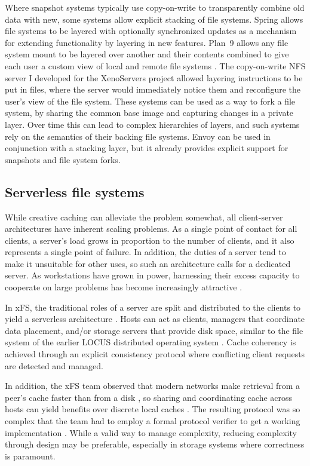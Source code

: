 Where snapshot systems typically use copy-on-write to transparently combine old data with new, some systems allow explicit stacking of file systems. Spring \cite{khalidi} allows file systems to be layered with optionally synchronized updates as a mechanism for extending functionality by layering in new features. Plan~9 \cite{pike90} allows any file system mount to be layered over another and their contents combined to give each user a custom view of local and remote file systems \cite{pike92}. The copy-on-write NFS server I developed for the XenoServers project \cite{kotsovinos} allowed layering instructions to be put in files, where the server would immediately notice them and reconfigure the user's view of the file system. These systems can be used as a way to fork a file system, by sharing the common base image and capturing changes in a private layer. Over time this can lead to complex hierarchies of layers, and such systems rely on the semantics of their backing file systems. Envoy can be used in conjunction with a stacking layer, but it already provides explicit support for snapshots and file system forks.

\subsection{Serverless file systems}

While creative caching can alleviate the problem somewhat, all client-server architectures have inherent scaling problems. As a single point of contact for all clients, a server's load grows in proportion to the number of clients, and it also represents a single point of failure. In addition, the duties of a server tend to make it unsuitable for other uses, so such an architecture calls for a dedicated server. As workstations have grown in power, harnessing their excess capacity to cooperate on large problems has become increasingly attractive \cite{anderson95a}.

In xFS, the traditional roles of a server are split and distributed to the clients to yield a serverless architecture \cite{wang93,anderson95b}. Hosts can act as clients, managers that coordinate data placement, and/or storage servers that provide disk space, similar to the file system of the earlier LOCUS distributed operating system \cite{walker}. Cache coherency is achieved through an explicit consistency protocol where conflicting client requests are detected and managed.

In addition, the xFS team observed that modern networks make retrieval from a peer's cache faster than from a disk \cite{dahlin94b}, so sharing and coordinating cache across hosts can yield benefits over discrete local caches \cite{dahlin94a}. The resulting protocol was so complex that the team had to employ a formal protocol verifier to get a working implementation \cite{wang98}. While a valid way to manage complexity, reducing complexity through design may be preferable, especially in storage systems where correctness is paramount.

